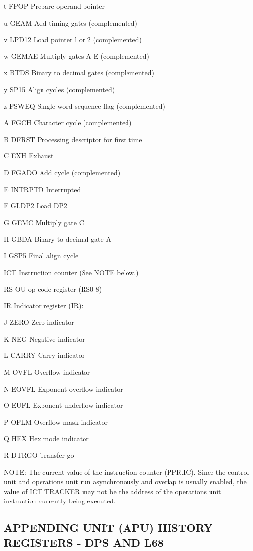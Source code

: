 t FPOP Prepare operand pointer

u GEAM Add timing gates (complemented)

v LPD12 Load pointer l or 2 (complemented)

w GEMAE Multiply gates A E (complemented)

x BTDS Binary to decimal gates (complemented)

y SP15 Align cycles (complemented)

z FSWEQ Single word sequence flag (complemented)

A FGCH Character cycle (complemented)

B DFRST Processing descriptor for first time

C EXH Exhaust

D FGADO Add cycle (complemented)

E INTRPTD Interrupted

F GLDP2 Load DP2

G GEMC Multiply gate C

H GBDA Binary to decimal gate A

I GSP5 Final align cycle

ICT Instruction counter (See NOTE below.)

RS OU op-code register (RS0-8)

IR Indicator register (IR):

J ZERO Zero indicator

K NEG Negative indicator

L CARRY Carry indicator

M OVFL Overflow indicator

N EOVFL Exponent overflow indicator

O EUFL Exponent underflow indicator

P OFLM Overflow mask indicator

Q HEX Hex mode indicator

R DTRGO Transfer go

NOTE: The current value of the instruction counter (PPR.IC). Since the control
unit and operations unit run asynchronously and overlap is usually enabled, the
value of ICT TRACKER may not be the address of the operations unit instruction
currently being executed.

\subsection{APPENDING UNIT (APU) HISTORY REGISTERS - DPS AND L68}

